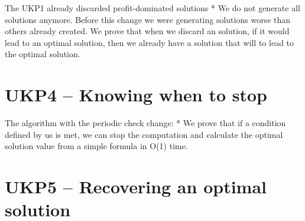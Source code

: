 \documentclass[12pt]{article}
\begin{document}
The UKP1 already discarded profit-dominated solutions 
* We do not generate all solutions anymore. Before this change we were generating solutions worse than others already created. We prove that when we discard an solution, if it would lead to an optimal solution, then we already have a solution that will to lead to the optimal solution.

\section{UKP4 -- Knowing when to stop}
The algorithm with the periodic check change:
	* We prove that if a condition defined by us is met, we can stop the computation and calculate the optimal solution value from a simple formula in O(1) time.

\section{UKP5 -- Recovering an optimal solution}
\end{document}
